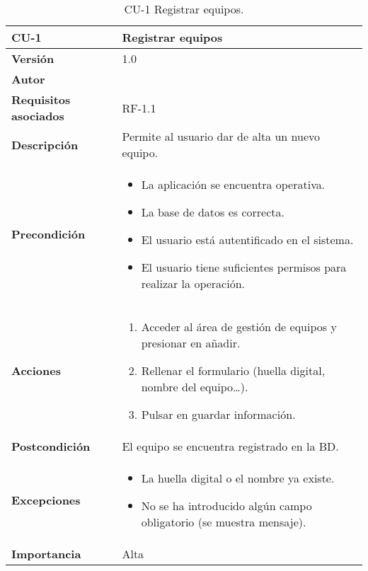\begin{table}[p]
	\centering
	\begin{tabularx}{\linewidth}{ p{} p{} }
		\toprule
		\textbf{CU-1}    & \textbf{ Registrar equipos}\\
		\toprule
		\textbf{Versión}              & 1.0    \\
		\textbf{Autor}                & \@author{} \\
		\textbf{Requisitos asociados} & RF-1.1\\
		\textbf{Descripción}          & Permite al usuario dar de alta un nuevo equipo. \\
		\textbf{Precondición}         &
		\begin{itemize}
			\tightlist
			\item La aplicación se encuentra operativa.
			\item La base de datos es correcta.
			\item El usuario está autentificado en el sistema.
			\item El usuario tiene suficientes permisos para realizar la operación.
		\end{itemize}\\
		\textbf{Acciones}             &
		\begin{enumerate}
			\tightlist
			\item Acceder al área de gestión de equipos y presionar en añadir.
			\item Rellenar el formulario (huella digital, nombre del equipo\ldots).
			\item Pulsar en guardar información.
		\end{enumerate}\\
		\textbf{Postcondición}        & El equipo se encuentra registrado en la BD.\\
		\textbf{Excepciones}          &
		\begin{itemize}
			\tightlist
			\item La huella digital o el nombre ya existe.
			\item No se ha introducido algún campo obligatorio (se muestra mensaje).
		\end{itemize}\\
		\textbf{Importancia}          & Alta\\
		\bottomrule
	\end{tabularx}
	\caption{CU-1 Registrar equipos.}\label{tab:table-1}
\end{table}

